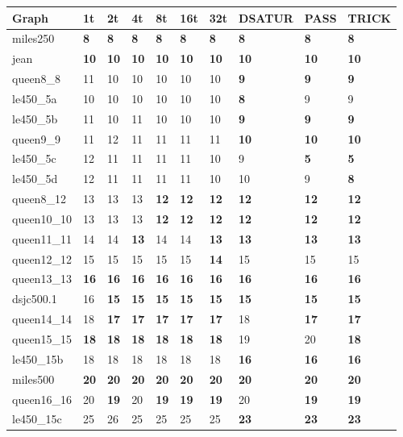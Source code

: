 \documentclass[12pt,a4paper,twoside]{scrartcl}
\numberwithin{equation}{section}
\begin{document}
\begin{table}[!htbp]
\begin{tabular}{|p{2.5cm} |p{1cm} p{1cm} p{1cm} p{1cm} p{1cm} p{1cm} p{1.8cm} p{1cm} p{1cm}|}
Graph&1t&2t&4t&8t&16t&32t&DSATUR&PASS&TRICK\\ \hline
miles250&\textbf{8}&\textbf{8}&\textbf{8}&\textbf{8}&\textbf{8}&\textbf{8}&\textbf{8}&\textbf{8}&\textbf{8}\\ 
jean&\textbf{10}&\textbf{10}&\textbf{10}&\textbf{10}&\textbf{10}&\textbf{10}&\textbf{10}&\textbf{10}&\textbf{10}\\
queen8\_8&11&10&10&10&10&10&\textbf{9}&\textbf{9}&\textbf{9}\\
le450\_5a&10&10&10&10&10&10&\textbf{8}&9&9\\ 
le450\_5b&11&10&11&10&10&10&\textbf{9}&\textbf{9}&\textbf{9}\\ \hline
queen9\_9&11&12&11&11&11&11&\textbf{10}&\textbf{10}&\textbf{10}\\ 
le450\_5c&12&11&11&11&11&10&9&\textbf{5}&\textbf{5}\\ 
le450\_5d&12&11&11&11&11&10&10&9&\textbf{8}\\ 
queen8\_12&13&13&13&\textbf{12}&\textbf{12}&\textbf{12}&\textbf{12}&\textbf{12}&\textbf{12}\\ 
queen10\_10&13&13&13&\textbf{12}&\textbf{12}&\textbf{12}&\textbf{12}&\textbf{12}&\textbf{12}\\ \hline
queen11\_11&14&14&\textbf{13}&14&14&\textbf{13}&\textbf{13}&\textbf{13}&\textbf{13}\\
queen12\_12&15&15&15&15&15&\textbf{14}&15&15&15\\ 
queen13\_13&\textbf{16}&\textbf{16}&\textbf{16}&\textbf{16}&\textbf{16}&\textbf{16}&\textbf{16}&\textbf{16}&\textbf{16}\\ 
dsjc500.1&16&\textbf{15}&\textbf{15}&\textbf{15}&\textbf{15}&\textbf{15}&\textbf{15}&\textbf{15}&\textbf{15}\\ 
queen14\_14&18&\textbf{17}&\textbf{17}&\textbf{17}&\textbf{17}&\textbf{17}&18&\textbf{17}&\textbf{17}\\ \hline
queen15\_15&\textbf{18}&\textbf{18}&\textbf{18}&\textbf{18}&\textbf{18}&\textbf{18}&19&20&\textbf{18}\\ 
le450\_15b&18&18&18&18&18&18&\textbf{16}&\textbf{16}&\textbf{16}\\ 
miles500&\textbf{20}&\textbf{20}&\textbf{20}&\textbf{20}&\textbf{20}&\textbf{20}&\textbf{20}&\textbf{20}&\textbf{20}\\ 
queen16\_16&20&\textbf{19}&20&\textbf{19}&\textbf{19}&\textbf{19}&20&\textbf{19}&\textbf{19}\\ 
le450\_15c&25&26&25&25&25&25&\textbf{23}&\textbf{23}&\textbf{23}\\ \hline

\end{tabular}
\end{table}
\end{document}

